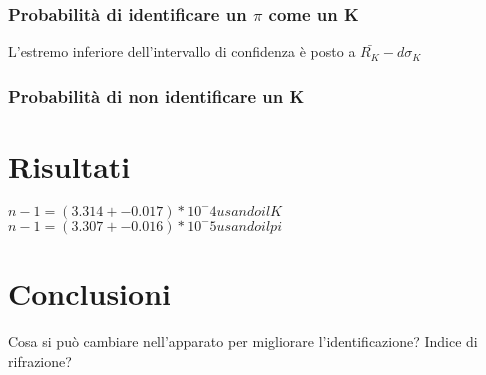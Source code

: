 \documentclass[8pt]{extarticle}
\begin{document}
\subsubsection{Probabilità di identificare un $\pi$ come un K}
L'estremo inferiore dell'intervallo di confidenza è posto a $\bar{R_K}-d\sigma_K$
\subsubsection{Probabilità di non identificare un K}

\section{Risultati}
$n-1=(3.314+-0.017)*10^-4 usando il K$
$n-1=(3.307+-0.016)*10^-5 usando il pi$
\section{Conclusioni}
Cosa si può cambiare nell'apparato per migliorare l'identificazione? Indice di rifrazione?
%
\end{document}
